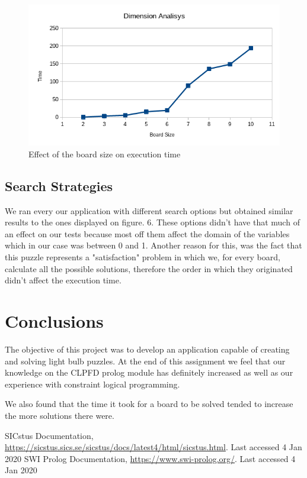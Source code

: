 \documentclass[runningheads]{llncs}
\begin{document}
\begin{figure}
	\includegraphics[scale=0.5]{graph}
	\centering
	\caption{Effect of the board size on execution time}
	\centering
\end{figure}

\subsection{Search Strategies}
We ran every our application with different search options but obtained similar results to the ones displayed on figure. 6. These options didn't have that much of an effect on our tests because most off them affect the domain of the variables which in our case was between 0 and 1. Another reason for this, was the fact that this puzzle represents a "satisfaction" problem in which we, for every board, calculate all the possible solutions, therefore the order in which they originated didn't affect the execution time.

\section{Conclusions}
The objective of this project was to develop an application capable of creating and solving light bulb puzzles. At the end of this assignment we feel that our knowledge on the CLPFD prolog module has definitely increased as well as our experience with constraint logical programming.

We also found that the time it took for a board to be solved tended to increase the more solutions there were.

%
%
% 
% 
%
\begin{thebibliography}{8}
SICstus Documentation, \url{https://sicstus.sics.se/sicstus/docs/latest4/html/sicstus.html}. Last accessed 4
Jan 2020
SWI Prolog Documentation, \url{https://www.swi-prolog.org/}. Last accessed 4
Jan 2020
\end{thebibliography}
\end{document}
